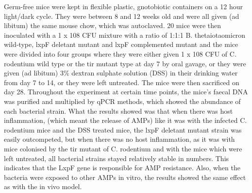 Germ-free mice were kept in flexible plastic, gnotobiotic containers on a 12 hour light/dark cycle. They were between 8 and 12 weeks old and were all given (ad libitum) the same mouse chow, which was autoclaved. 20 mice were then inoculated with a 1 x 108 CFU mixture with a ratio of 1:1:1 B. thetaiotaomicron wild-type, lxpF deletant mutant and lxpF complemented mutant and the mice were divided into four groups where they were either given 1 x 108 CFU of C. rodentium wild type or the tir mutant type at day 7 by oral gavage, or they were given (ad libitum) 3\% dextran sulphate solution (DSS) in their drinking water from day 7 to 14, or they were left untreated. The mice were then sacrificed on day 28. Throughout the experiment at certain time points, the mice’s faecal DNA was purified and multiplied by qPCR methods, which showed the abundance of each bacterial strain.
What the results showed was that when there was host inflammation, (which meant the release of AMPs) like it was with the infected C. rodentium mice and the DSS treated mice, the lxpF deletant mutant strain was easily outcompeted, but when there was no host inflammation, as it was with mice colonised by the tir mutant of C. rodentium and with the mice which were left untreated, all bacterial strains stayed relatively stable in numbers. This indicates that the LxpF gene is responsible for AMP resistance. Also, when the bacteria were exposed to other AMPs in vitro, the results showed the same effect as with the in vivo model.

